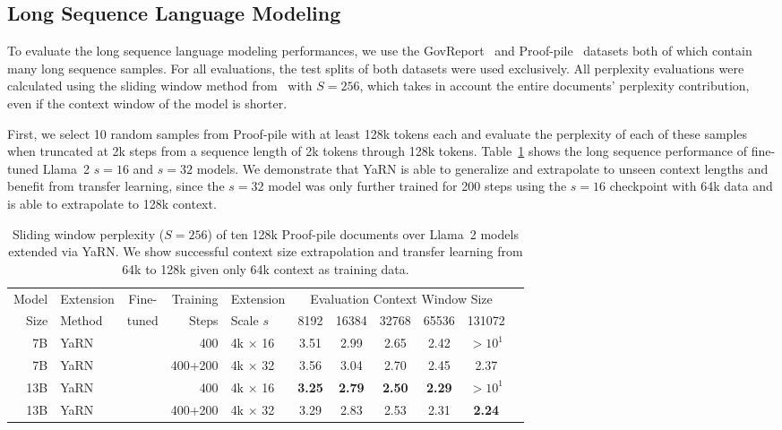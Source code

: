 \documentclass{article} %
\newcommand{\cmark}{\textcolor{green!80!black}{\ding{51}}}
\begin{document}
\subsection{Long Sequence Language Modeling}\label{sec:long-sequence}

To evaluate the long sequence language modeling performances, we use the GovReport~\citep{huang-etal-2021-efficient} and Proof-pile~\citep{proofpile} datasets both of which contain many long sequence samples.
For all evaluations, the test splits of both datasets were used exclusively.
All perplexity evaluations were calculated using the sliding window method from~\citet{press2022train} with $S = 256$, which takes in account the entire documents' perplexity contribution, even if the context window of the model is shorter.

First, we select 10 random samples from Proof-pile with at least 128k tokens each and evaluate the perplexity of each of these samples when truncated at 2k steps from a sequence length of 2k tokens through 128k tokens. Table~\ref{tab:128k-comparison} shows the long sequence performance of fine-tuned Llama~2 $s=16$ and $s=32$ models. We demonstrate that YaRN is able to generalize and extrapolate to unseen context lengths and benefit from transfer learning, since the $s=32$ model was only further trained for 200 steps using the $s=16$ checkpoint with 64k data and is able to extrapolate to 128k context.


\begin{table}[h]
    \centering
    \begin{tabular}{rlcrlcccccc}
        \toprule
         Model & Extension & Fine- & Training & Extension & \multicolumn{5}{c}{Evaluation Context Window Size}  \\
         Size  & Method    & tuned &  Steps   & Scale $s$ & 8192 & 16384 & 32768 & 65536 & 131072\\
        \midrule
        7B & YaRN & \cmark &  400 & 4k $\times$ 16 & 3.51 & 2.99 & 2.65 & 2.42 & $>10^1$ \\
        7B & YaRN & \cmark & 400+200 & 4k $\times$ 32 & 3.56 & 3.04 & 2.70 & 2.45 & 2.37 \\
        \midrule
        13B & YaRN & \cmark &  400 & 4k $\times$ 16 & {\bf 3.25} & {\bf 2.79} & {\bf 2.50} & {\bf 2.29} & $>10^1$ \\
        13B & YaRN & \cmark & 400+200 & 4k $\times$ 32 & 3.29 & 2.83 & 2.53 & 2.31 & {\bf 2.24} \\   
        \bottomrule
    \end{tabular}
    \caption{\small Sliding window perplexity ($S=256$) of ten 128k Proof-pile documents over Llama~2 models extended via YaRN. We show successful context size extrapolation and transfer learning from 64k to 128k given only 64k context as training data.}
    \label{tab:128k-comparison}
\end{table}
\end{document}

